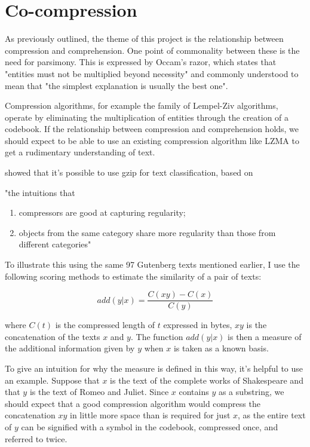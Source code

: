 \section{Co-compression}

As previously outlined, the theme of this project is the relationship between compression and comprehension. One point of commonality between these is the need for parsimony. This is expressed by Occam's razor, which states that "entities must not be multiplied beyond necessity" and commonly understood to mean that "the simplest explanation is usually the best one". 

Compression algorithms, for example the family of Lempel-Ziv algorithms, operate by eliminating the multiplication of entities through the creation of a codebook. If the relationship between compression and comprehension holds, we should expect to be able to use an existing compression algorithm like LZMA to get a rudimentary understanding of text.

\textcite{Jiang2023} showed that it's possible to use gzip for text classification, based on

\begin{displayquote}
"the intuitions that
\begin{enumerate}
\item compressors are good at capturing regularity; 
\item objects from the same category share more regularity than those from different categories"
\end{enumerate}
\end{displayquote}

To illustrate this using the same 97 Gutenberg texts mentioned earlier, I use the following scoring methods to estimate the similarity of a pair of texts:

\[add(y|x) = \frac{C(xy) - C(x)}{C(y)}\]

where \(C(t)\) is the compressed length of \(t\) expressed in bytes, \(xy\) is the concatenation of the texts \(x\) and \(y\). The function \(add(y|x)\) is then a measure of the additional information given by \(y\) when \(x\) is taken as a known basis.

To give an intuition for why the measure is defined in this way, it's helpful to use an example. Suppose that $x$ is the text of the complete works of Shakespeare and that $y$ is the text of Romeo and Juliet. Since $x$ contains $y$ as a substring, we should expect that a good compression algorithm would compress the concatenation $xy$ in little more space than is required for just $x$, as the entire text of $y$ can be signified with a symbol in the codebook, compressed once, and referred to twice.

